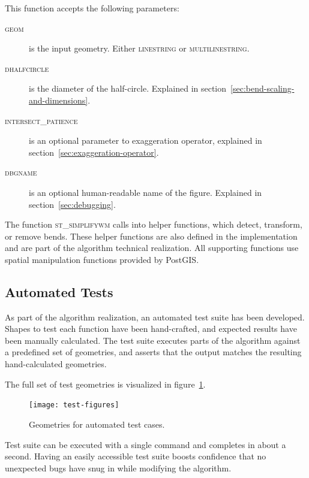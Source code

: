 \documentclass[a4paper]{article}
\begin{document}
This function accepts the following parameters:
\begin{description}

    \item[\normalfont\textsc{geom}] is the input geometry. Either
        \textsc{linestring} or \textsc{multilinestring}.

    \item[\normalfont\textsc{dhalfcircle}] is the diameter of the half-circle.
        Explained in section~\ref{sec:bend-scaling-and-dimensions}.

    \item[\normalfont\textsc{intersect\_patience}] is an optional parameter to
        exaggeration operator, explained in
        section~\ref{sec:exaggeration-operator}.

    \item[\normalfont\textsc{dbgname}] is an optional human-readable name of
        the figure. Explained in section~\ref{sec:debugging}.

\end{description}

The function \textsc{st\_simplifywm} calls into helper functions, which detect,
transform, or remove bends. These helper functions are also defined in the
implementation and are part of the algorithm technical realization. All
supporting functions use spatial manipulation functions provided by PostGIS.

\subsection{Automated Tests}
\label{sec:automated-tests}

As part of the algorithm realization, an automated test suite has been
developed. Shapes to test each function have been hand-crafted, and expected
results have been manually calculated. The test suite executes parts of the
algorithm against a predefined set of geometries, and asserts that the output
matches the resulting hand-calculated geometries.

The full set of test geometries is visualized in figure~\ref{fig:test-figures}.

\begin{figure}[ht]
    \centering
    \texttt{[image: test-figures]}
    \caption{Geometries for automated test cases.}
    \label{fig:test-figures}
\end{figure}

Test suite can be executed with a single command and completes in about a
second. Having an easily accessible test suite boosts confidence that no
unexpected bugs have snug in while modifying the algorithm.
\end{document}
